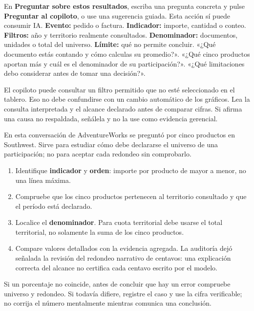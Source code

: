 En \textbf{Preguntar sobre estos resultados}, escriba una pregunta concreta y pulse \textbf{Preguntar al copiloto}, o use una sugerencia guiada. Esta acción sí puede consumir IA.
\textbf{Evento:} pedido o factura. \textbf{Indicador:} importe, cantidad o conteo. \textbf{Filtros:} año y territorio realmente consultados. \textbf{Denominador:} documentos, unidades o total del universo. \textbf{Límite:} qué no permite concluir.
«¿Qué documento estás contando y cómo calculas su promedio?». «¿Qué cinco productos aportan más y cuál es el denominador de su participación?». «¿Qué limitaciones debo considerar antes de tomar una decisión?».
\begin{note}
El copiloto puede consultar un filtro permitido que no esté seleccionado en el tablero. Eso no debe confundirse con un cambio automático de los gráficos. Lea la consulta interpretada y el alcance declarado antes de comparar cifras. Si afirma una causa no respaldada, señálela y no la use como evidencia gerencial.
\end{note}

En esta conversación de AdventureWorks se preguntó por cinco productos en Southwest. Sirve para estudiar cómo debe declararse el universo de una participación; no para aceptar cada redondeo sin comprobarlo.
\begin{enumerate}
\item Identifique \textbf{indicador} y \textbf{orden}: importe por producto de mayor a menor, no una línea máxima.
\item Compruebe que los cinco productos pertenecen al territorio consultado y que el período está declarado.
\item Localice el \textbf{denominador}. Para cuota territorial debe usarse el total territorial, no solamente la suma de los cinco productos.
\item Compare valores detallados con la evidencia agregada. La auditoría dejó señalada la revisión del redondeo narrativo de centavos: una explicación correcta del alcance no certifica cada centavo escrito por el modelo.
\end{enumerate}
\begin{note}
Si un porcentaje no coincide, antes de concluir que hay un error compruebe universo y redondeo. Si todavía difiere, registre el caso y use la cifra verificable; no corrija el número mentalmente mientras comunica una conclusión.
\end{note}

